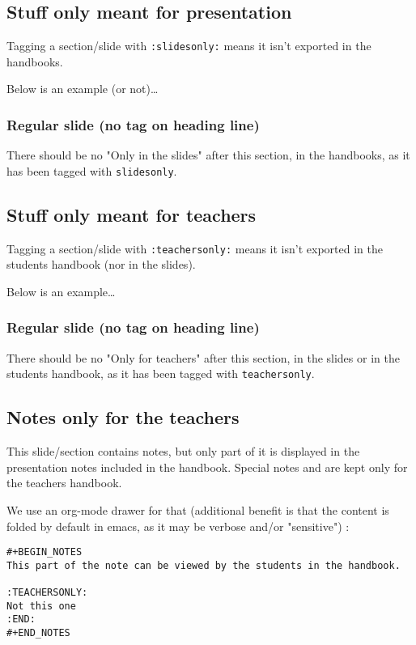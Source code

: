 \documentclass[a4paper]{article}
\begin{document}
\subsection{Stuff only meant for presentation}
\label{sec:org8aedc4b}

Tagging a section/slide with \texttt{:slidesonly:} means it isn't exported in the handbooks.

Below is an example (or not)\ldots{}

\subsubsection{Regular slide (no tag on heading line)}
\label{sec:orgcb34a6d}

There should be no "Only in the slides" after this section, in the
handbooks, as it has been tagged with \texttt{slidesonly}.

\subsection{Stuff only meant for teachers}
\label{sec:orgb3ebe33}

Tagging a section/slide with \texttt{:teachersonly:} means it isn't exported in the students handbook (nor in the slides).

Below is an example\ldots{}

\subsubsection{Regular slide (no tag on heading line)}
\label{sec:orga17b719}

There should be no "Only for teachers" after this section, in the slides or in the
students handbook, as it has been tagged with \texttt{teachersonly}.

\subsection{Notes only for the teachers}
\label{sec:org07042a6}

This slide/section contains notes, but only part of it is displayed in
the presentation notes included in the handbook. Special notes and are
kept only for the teachers handbook.

We use an org-mode drawer for that (additional benefit is that the content is folded by default in emacs, as it may be verbose and/or "sensitive") :
\begin{verbatim}
#+BEGIN_NOTES
This part of the note can be viewed by the students in the handbook.

:TEACHERSONLY:
Not this one
:END:
#+END_NOTES
\end{verbatim}
\end{document}
